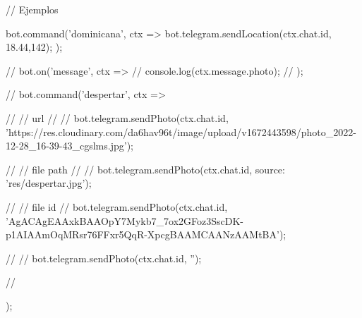 // Ejemplos



bot.command('dominicana', ctx => {
    bot.telegram.sendLocation(ctx.chat.id, 18.44,142);
});


// bot.on('message', ctx => {
    //     console.log(ctx.message.photo);
    // });
    
    // bot.command('despertar', ctx => {
    //     // url
    //     // bot.telegram.sendPhoto(ctx.chat.id, 'https://res.cloudinary.com/da6hav96t/image/upload/v1672443598/photo_2022-12-28_16-39-43_cgslms.jpg');
        
    //     // file path
    //     // bot.telegram.sendPhoto(ctx.chat.id, {source: 'res/despertar.jpg'});
        
    //     // file id
    //     bot.telegram.sendPhoto(ctx.chat.id, 'AgACAgEAAxkBAAOpY7Mykb7_7ox2GFoz3SscDK-p1AIAAmOqMRsr76FFxr5QqR-XpcgBAAMCAANzAAMtBA');
        
    //     // bot.telegram.sendPhoto(ctx.chat.id, '');
    
    // });
    